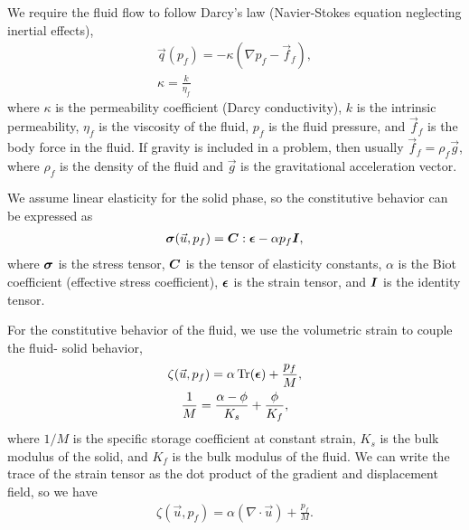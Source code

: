 We require the fluid flow to follow Darcy's law (Navier-Stokes equation neglecting inertial 
effects),
\begin{gather}
  \vec{q}(p_f) = -\kappa (\nabla p_f - \vec{f}_f), \\
%
  \kappa = \frac{k}{\eta_f}
\end{gather}
where $\kappa$ is the permeability coefficient (Darcy conductivity),
$k$ is the intrinsic permeability, $\eta_f$ is the viscosity of the
fluid, $p_f$ is the fluid pressure, and $\vec{f}_f$ is the body force
in the fluid. If gravity is included in a problem, then usually
$\vec{f}_f = \rho_f \vec{g}$, where $\rho_f$ is the density of the
fluid and $\vec{g}$ is the gravitational acceleration vector.

We assume linear elasticity for the solid phase, so the constitutive behavior can be expressed 
as
\begin{gather}
  \bm{\sigma}(\vec{u},p_f) = \bm{C} : \bm{\epsilon} - \alpha p_f \bm{I},
\end{gather}
where $\bm{\sigma}$ is the stress tensor, $\bm{C}$ is the
tensor of elasticity constants, $\alpha$ is the Biot coefficient
(effective stress coefficient), $\bm{\epsilon}$ is the strain
tensor, and $\bm{I}$ is the identity tensor.

For the constitutive behavior of the fluid, we use the volumetric strain to couple the fluid-
solid behavior,
\begin{gather}
  \zeta(\vec{u},p_f) = \alpha \Tr({\tensor{\epsilon}}) + \frac{p_f}{M}, \\
%
  \frac{1}{M} = \frac{\alpha-\phi}{K_s} + \frac{\phi}{K_f},
\end{gather}
where $1/M$ is the specific storage coefficient at constant strain,
$K_s$ is the bulk modulus of the solid, and $K_f$ is the bulk modulus
of the fluid. We can write the trace of the strain tensor as the dot product of the gradient 
and displacement 
field, so we have
\begin{gather}
  \zeta(\vec{u},p_f) = \alpha (\nabla \cdot \vec{u}) + \frac{p_f}{M}.
\end{gather}

